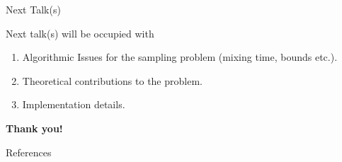 \documentclass{beamer}
\begin{document}
\begin{frame}{Next Talk(s)}

Next talk(s) will be occupied with 

\begin{enumerate}
    \item Algorithmic Issues for the sampling problem (mixing time, bounds etc.).
    \item Theoretical contributions to the problem.
    \item Implementation details.
\end{enumerate}
    
\end{frame}


\begin{frame}{}
    \vfill
    \centering
    \Huge {
        \textbf{Thank you!}
    }
    \vfill
\end{frame}



\begin{frame}[allowframebreaks]{References}
    \small {

    
    
    
    }
\end{frame}
\end{document}
